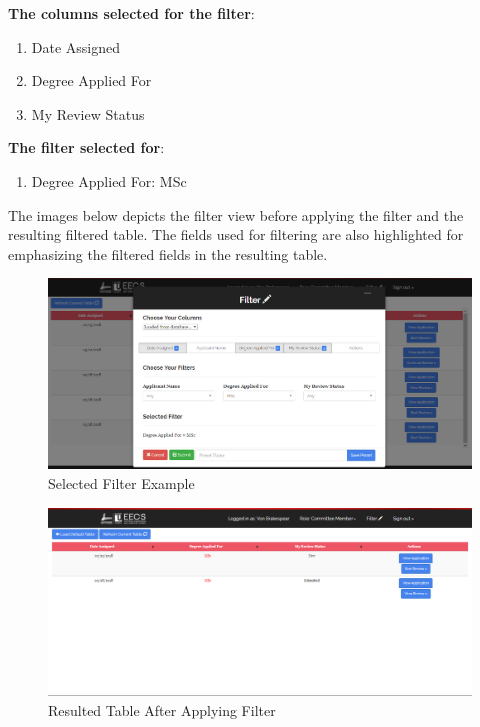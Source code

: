 \documentclass[fontsize=12pt,paper=letter,twoside]{scrartcl}
\begin{document}
\bigskip
\noindent \textbf{The columns selected for the filter}:
\begin{enumerate}
\item Date Assigned
\item Degree Applied For
\item My Review Status
\end{enumerate}

\noindent \textbf{The filter selected for}:
\begin{enumerate}
\item Degree Applied For: MSc
\end{enumerate}

\bigskip
\noindent The images below depicts the filter view before applying the filter and the resulting filtered table. The fields used for filtering are also highlighted for emphasizing the filtered fields in the resulting table.

\begin{figure}[!htb]
\begin{center}
\includegraphics[width=.9\textwidth]{images/example_filter.png}
\end{center}
\caption{Selected Filter Example}
\label{fig:example_filter}
\end{figure}

\begin{figure}[!htb]
\begin{center}
\includegraphics[width=.9\textwidth]{images/example_filter_table.png}
\end{center}
\caption{Resulted Table After Applying Filter}
\label{fig:resulted_table}
\end{figure}
\end{document}
